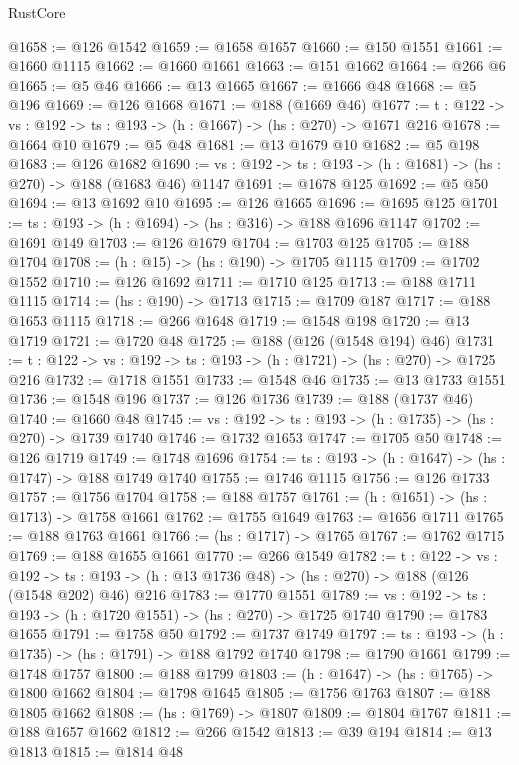 \begin{lexlean}{RustCore}
\begin{coremodule}
@1658 := @126 @1542
@1659 := @1658 @1657
@1660 := @150 @1551
@1661 := @1660 @1115
@1662 := @1660 @1661
@1663 := @151 @1662
@1664 := @266 @6
@1665 := @5 @46
@1666 := @13 @1665
@1667 := @1666 @48
@1668 := @5 @196
@1669 := @126 @1668
@1671 := @188 (@1669 @46)
@1677 := {t : @122} -> {vs : @192} -> {ts : @193} -> (h : @1667) -> (hs : @270) -> @1671 @216
@1678 := @1664 @10
@1679 := @5 @48
@1681 := @13 @1679 @10
@1682 := @5 @198
@1683 := @126 @1682
@1690 := {vs : @192} -> {ts : @193} -> (h : @1681) -> (hs : @270) -> @188 (@1683 @46) @1147
@1691 := @1678 @125
@1692 := @5 @50
@1694 := @13 @1692 @10
@1695 := @126 @1665
@1696 := @1695 @125
@1701 := {ts : @193} -> (h : @1694) -> (hs : @316) -> @188 @1696 @1147
@1702 := @1691 @149
@1703 := @126 @1679
@1704 := @1703 @125
@1705 := @188 @1704
@1708 := (h : @15) -> (hs : @190) -> @1705 @1115
@1709 := @1702 @1552
@1710 := @126 @1692
@1711 := @1710 @125
@1713 := @188 @1711 @1115
@1714 := (hs : @190) -> @1713
@1715 := @1709 @187
@1717 := @188 @1653 @1115
@1718 := @266 @1648
@1719 := @1548 @198
@1720 := @13 @1719
@1721 := @1720 @48
@1725 := @188 (@126 (@1548 @194) @46)
@1731 := {t : @122} -> {vs : @192} -> {ts : @193} -> (h : @1721) -> (hs : @270) -> @1725 @216
@1732 := @1718 @1551
@1733 := @1548 @46
@1735 := @13 @1733 @1551
@1736 := @1548 @196
@1737 := @126 @1736
@1739 := @188 (@1737 @46)
@1740 := @1660 @48
@1745 := {vs : @192} -> {ts : @193} -> (h : @1735) -> (hs : @270) -> @1739 @1740
@1746 := @1732 @1653
@1747 := @1705 @50
@1748 := @126 @1719
@1749 := @1748 @1696
@1754 := {ts : @193} -> (h : @1647) -> (hs : @1747) -> @188 @1749 @1740
@1755 := @1746 @1115
@1756 := @126 @1733
@1757 := @1756 @1704
@1758 := @188 @1757
@1761 := (h : @1651) -> (hs : @1713) -> @1758 @1661
@1762 := @1755 @1649
@1763 := @1656 @1711
@1765 := @188 @1763 @1661
@1766 := (hs : @1717) -> @1765
@1767 := @1762 @1715
@1769 := @188 @1655 @1661
@1770 := @266 @1549
@1782 := {t : @122} ->
  {vs : @192} ->
  {ts : @193} -> (h : @13 @1736 @48) -> (hs : @270) -> @188 (@126 (@1548 @202) @46) @216
@1783 := @1770 @1551
@1789 := {vs : @192} -> {ts : @193} -> (h : @1720 @1551) -> (hs : @270) -> @1725 @1740
@1790 := @1783 @1655
@1791 := @1758 @50
@1792 := @1737 @1749
@1797 := {ts : @193} -> (h : @1735) -> (hs : @1791) -> @188 @1792 @1740
@1798 := @1790 @1661
@1799 := @1748 @1757
@1800 := @188 @1799
@1803 := (h : @1647) -> (hs : @1765) -> @1800 @1662
@1804 := @1798 @1645
@1805 := @1756 @1763
@1807 := @188 @1805 @1662
@1808 := (hs : @1769) -> @1807
@1809 := @1804 @1767
@1811 := @188 @1657 @1662
@1812 := @266 @1542
@1813 := @39 @194
@1814 := @13 @1813
@1815 := @1814 @48

\end{coremodule}
\end{lexlean}
